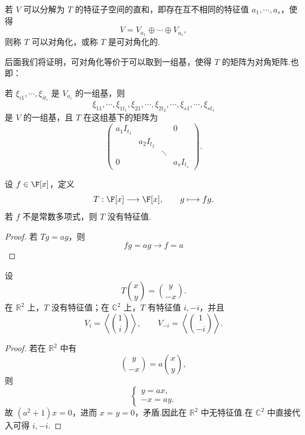 \begin{definition}\label{p1:concept:c5-l241}
	若 $V$ 可以分解为 $T$ 的特征子空间的直和，即存在互不相同的特征值 $a_1,\cdots,a_s$，使得
	\[
	V=V_{a_1}\oplus\cdots\oplus V_{a_s},
	\]
	则称 $T$ 可以对角化，或称 $T$ 是可对角化的.
\end{definition}
后面我们将证明，可对角化等价于可以取到一组基，使得 $T$ 的矩阵为对角矩阵.也即：

若 $\xi_{i1},\cdots,\xi_{it_i}$ 是 $V_{a_i}$ 的一组基，则
\[
\xi_{11},\cdots,\xi_{1t_1},\xi_{21},\cdots,\xi_{2t_2},\cdots,
\xi_{s1},\cdots,\xi_{st_s}
\]
是 $V$ 的一组基，且 $T$ 在这组基下的矩阵为
\[
\begin{pmatrix}
	a_1I_{t_1}&&&0\\
	&a_2I_{t_2}&&\\
	&&\ddots&\\
	0&&&a_sI_{t_s}
\end{pmatrix}.
\]





\begin{example}
	设 $f\in\F[x]$，定义
	\[
	T:\F[x]\longrightarrow\F[x],\qquad g\longmapsto fg.
	\]
	若 $f$ 不是常数多项式，则 $T$ 没有特征值.
\end{example}

\begin{proof}
	若 $Tg=ag$，则
	\[
	fg=ag\rightarrow f = a
	\]
	
\end{proof}

\begin{example}
	设
	\[
	T\binom{x}{y}=\binom{y}{-x}.
	\]
	在 $\mathbb{R}^2$ 上，$T$ 没有特征值；在 $\mathbb{C}^2$ 上，$T$ 有特征值 $i,-i$，并且
	\[
	V_i=\left\langle\binom{1}{i}\right\rangle,
	\qquad
	V_{-i}=\left\langle\binom{1}{-i}\right\rangle.
	\]
\end{example}

\begin{proof}
	若在 $\mathbb{R}^2$ 中有
	\[
	\binom{y}{-x}=a\binom{x}{y},
	\]
	则
	\[
	\begin{cases}
		y=ax,\\
		-x=ay.
	\end{cases}
	\]
	故 $(a^2+1)x=0$，进而 $x=y=0$，矛盾.因此在 $\mathbb{R}^2$ 中无特征值.在 $\mathbb{C}^2$ 中直接代入可得 $i,-i$.
\end{proof}


